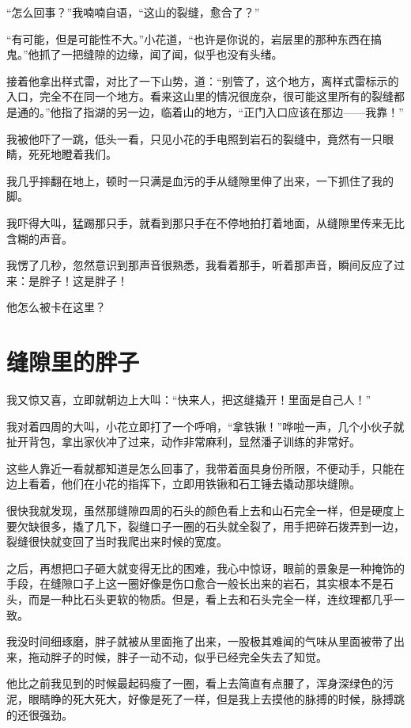 “怎么回事？”我喃喃自语，“这山的裂缝，愈合了？”

“有可能，但是可能性不大。”小花道，“也许是你说的，岩层里的那种东西在搞鬼。”他抓了一把缝隙的边缘，闻了闻，似乎也没有头绪。

接着他拿出样式雷，对比了一下山势，道：“别管了，这个地方，离样式雷标示的入口，完全不在同一个地方。看来这山里的情况很庞杂，很可能这里所有的裂缝都是通的。”他指了指湖的另一边，临着山的地方，“正门入口应该在那边——我靠！”

我被他吓了一跳，低头一看，只见小花的手电照到岩石的裂缝中，竟然有一只眼睛，死死地瞪着我们。

我几乎摔翻在地上，顿时一只满是血污的手从缝隙里伸了出来，一下抓住了我的脚。

我吓得大叫，猛踢那只手，就看到那只手在不停地拍打着地面，从缝隙里传来无比含糊的声音。

我愣了几秒，忽然意识到那声音很熟悉，我看着那手，听着那声音，瞬间反应了过来：是胖子！这是胖子！

他怎么被卡在这里？

\chapter{缝隙里的胖子}

我又惊又喜，立即就朝边上大叫：“快来人，把这缝撬开！里面是自己人！”

我对着四周的大叫，小花立即打了一个呼哨，“拿铁锹！”哗啦一声，几个小伙子就扯开背包，拿出家伙冲了过来，动作非常麻利，显然潘子训练的非常好。

这些人靠近一看就都知道是怎么回事了，我带着面具身份所限，不便动手，只能在边上看着，他们在小花的指挥下，立即用铁锹和石工锤去撬动那块缝隙。

很快我就发现，虽然那缝隙四周的石头的颜色看上去和山石完全一样，但是硬度上要欠缺很多，撬了几下，裂缝口子一圈的石头就全裂了，用手把碎石拨弄到一边，裂缝很快就变回了当时我爬出来时候的宽度。

之后，再想把口子砸大就变得无比的困难，我心中惊讶，眼前的景象是一种掩饰的手段，在缝隙口子上这一圈好像是伤口愈合一般长出来的岩石，其实根本不是石头，而是一种比石头更软的物质。但是，看上去和石头完全一样，连纹理都几乎一致。

我没时间细琢磨，胖子就被从里面拖了出来，一股极其难闻的气味从里面被带了出来，拖动胖子的时候，胖子一动不动，似乎已经完全失去了知觉。

他比之前我见到的时候最起码瘦了一圈，看上去简直有点腰了，浑身深绿色的污泥，眼睛睁的死大死大，好像是死了一样，但是我上去摸他的脉搏的时候，脉搏跳的还很强劲。

